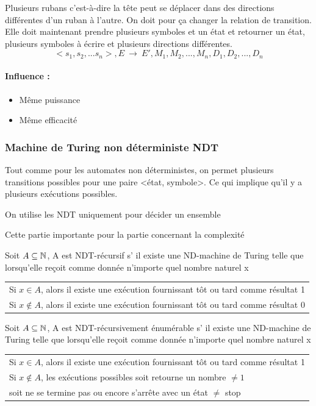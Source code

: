 Plusieurs rubans c'est-à-dire la tête peut se déplacer dans des directions 
différentes d'un ruban à l'autre. On doit pour ça changer la relation de 
transition. Elle doit maintenant prendre plusieurs symboles et un état et 
retourner un état, plusieurs symboles à écrire et plusieurs directions différentes.
$$<s_1,s_2,...s_n>, E \  \rightarrow \ E', M_1, M_2,..., M_n, D_1, D_2,..., 
D_n$$
\paragraph{Influence :} 
\begin{itemize}
	\item Même puissance
	\item Même efficacité
\end{itemize}

\subsubsection{Machine de Turing non déterministe NDT}
Tout comme pour les automates non déterministes, on permet plusieurs 
transitions possibles pour une paire <état, symbole>. Ce qui implique qu'il y a 
plusieurs exécutions possibles.

\begin{myrem}
	On utilise les NDT uniquement pour décider un ensemble
\end{myrem}

\begin{myrem}
	Cette partie importante pour la partie concernant la complexité
\end{myrem}

\begin{mydef} Soit $A\subseteq \mathbb{N}$, A est NDT-récursif s’ il 
	existe une ND-machine de Turing telle que lorsqu'elle reçoit comme 
	donnée n'importe quel nombre naturel x\\
	\begin{tabular}{l}
		Si $x\in A$, alors il existe une exécution fournissant tôt ou 
		tard comme résultat 1\\
		Si $x\notin A$, alors il existe une exécution fournissant tôt ou 
		tard comme résultat 0\\
	\end{tabular}
\end{mydef}

\begin{mydef} Soit $A\subseteq \mathbb{N}$, A est 
	NDT-récursivement énumérable s’ il 
	existe une ND-machine de Turing telle que lorsqu'elle reçoit comme 
	donnée n'importe quel nombre naturel x\\
	\begin{tabular}{l}
		Si $x\in A$, alors il existe une exécution fournissant tôt ou 
		tard comme résultat 1\\
		Si $x\notin A$, les exécutions possibles soit retourne un 
		nombre $\neq 1$ \\
		soit ne se termine pas ou encore s'arrête avec 
		un état $\neq$ stop\\
	\end{tabular}
\end{mydef}

